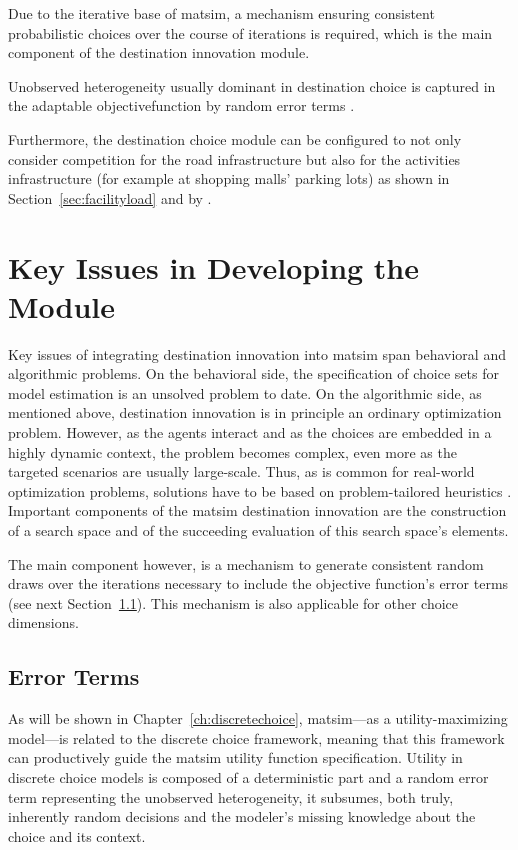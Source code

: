 Due to the iterative base of \gls{matsim}, a mechanism ensuring consistent probabilistic choices over the course of iterations is required, which is the main component of the destination innovation module.

Unobserved heterogeneity usually dominant in destination choice is captured in the adaptable \gls{objectivefunction} by random error terms \citep[][]{HorniEtAl_unpub_TRB_2012, Horni_PhDThesis_2013}.

Furthermore, the destination choice module can be configured to not only consider competition for the road infrastructure but also for the activities infrastructure (for example at shopping malls' parking lots) as shown in Section~\ref{sec:facilityload} and by \citet[][]{HorniEtAl_TRR_2009}.

\section{Key Issues in Developing the Module}
Key issues of integrating destination innovation into \gls{matsim} span behavioral and algorithmic problems. 
On the behavioral side, the specification of choice sets for model estimation is an unsolved problem to date. 
On the algorithmic side, as mentioned above, destination innovation is in principle an ordinary optimization problem. 
However, as the agents interact and as the choices are embedded in a highly dynamic context, the problem becomes complex, even more as the targeted scenarios are usually large-scale. 
Thus, as is common for real-world optimization problems, solutions have to be based on problem-tailored heuristics \citep[][]{MichalewiczFogel_2004}. 
Important components of the \gls{matsim} destination innovation are the construction of a search space and of the succeeding evaluation of this search space's elements. 

The main component however, is a mechanism to generate consistent random draws over the iterations necessary to include the objective function's error terms (see next Section~\ref{sec:errorterms}). 
This mechanism is also applicable for other choice dimensions.

\subsection{Error Terms}
\label{sec:errorterms}
As will be shown in Chapter~\ref{ch:discretechoice}, \gls{matsim}---as a utility-maximizing model---is related to the discrete choice framework, meaning that this framework can productively guide the \gls{matsim} utility function specification. 
Utility in discrete choice models is composed of a deterministic part and a random error term representing the unobserved heterogeneity, \ie it subsumes, both truly, \ie inherently random decisions and the modeler's missing knowledge about the choice and its context. 

